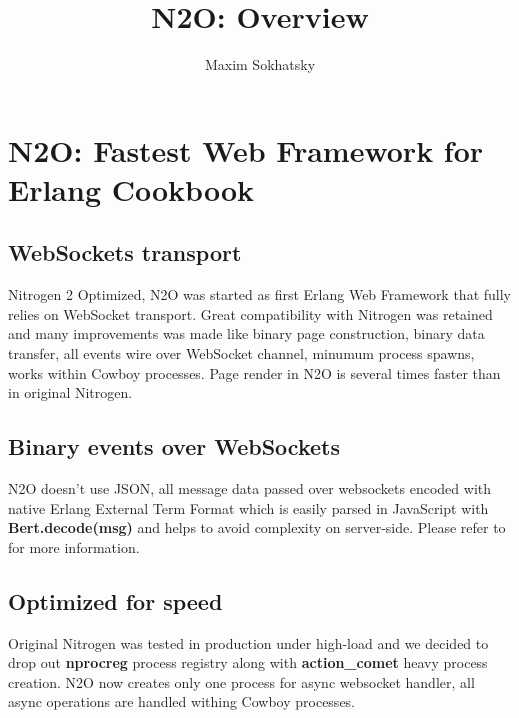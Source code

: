 \documentclass[11pt]{article}
\begin{document}
\title{N2O: Overview}
\author{Maxim Sokhatsky}

\paragraph{}
\section*{N2O: Fastest Web Framework for Erlang Cookbook}

\subsection*{WebSockets transport}
Nitrogen 2 Optimized, N2O was started as first Erlang Web Framework
that fully relies on WebSocket transport. Great compatibility with Nitrogen
was retained and many improvements was made like binary page construction,
binary data transfer, all events wire over WebSocket channel, minumum process spawns,
works within Cowboy processes. Page render in N2O is several times faster
than in original Nitrogen.

\subsection*{Binary events over WebSockets}
N2O doesn't use JSON, all message data passed over websockets encoded with
native Erlang External Term Format which is easily parsed in JavaScript
with {\bf Bert.decode(msg)} and helps to avoid complexity on server-side.
Please refer to  for more information.

\subsection*{Optimized for speed}
Original Nitrogen was tested in production under high-load and we decided to drop out
{\bf nprocreg} process registry along with {\bf{action\_comet}} heavy process creation. N2O now creates
only one process for async websocket handler, all async operations are handled withing
Cowboy processes.
\end{document}
